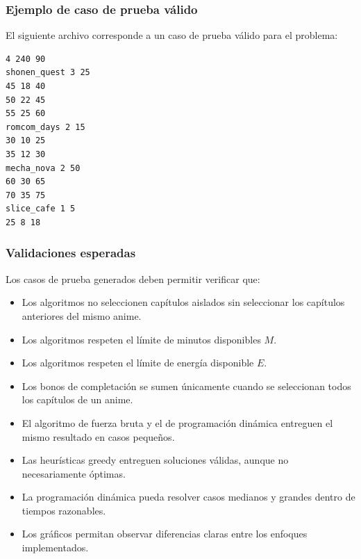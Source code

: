 \subsubsection{Ejemplo de caso de prueba válido}

El siguiente archivo corresponde a un caso de prueba válido para el problema:

\begin{verbatim}
4 240 90
shonen_quest 3 25
45 18 40
50 22 45
55 25 60
romcom_days 2 15
30 10 25
35 12 30
mecha_nova 2 50
60 30 65
70 35 75
slice_cafe 1 5
25 8 18
\end{verbatim}

\subsubsection{Validaciones esperadas}

Los casos de prueba generados deben permitir verificar que:

\begin{itemize}
    \item Los algoritmos no seleccionen capítulos aislados sin seleccionar los capítulos anteriores del mismo anime.
    \item Los algoritmos respeten el límite de minutos disponibles $M$.
    \item Los algoritmos respeten el límite de energía disponible $E$.
    \item Los bonos de completación se sumen únicamente cuando se seleccionan todos los capítulos de un anime.
    \item El algoritmo de fuerza bruta y el de programación dinámica entreguen el mismo resultado en casos pequeños.
    \item Las heurísticas greedy entreguen soluciones válidas, aunque no necesariamente óptimas.
    \item La programación dinámica pueda resolver casos medianos y grandes dentro de tiempos razonables.
    \item Los gráficos permitan observar diferencias claras entre los enfoques implementados.
\end{itemize}